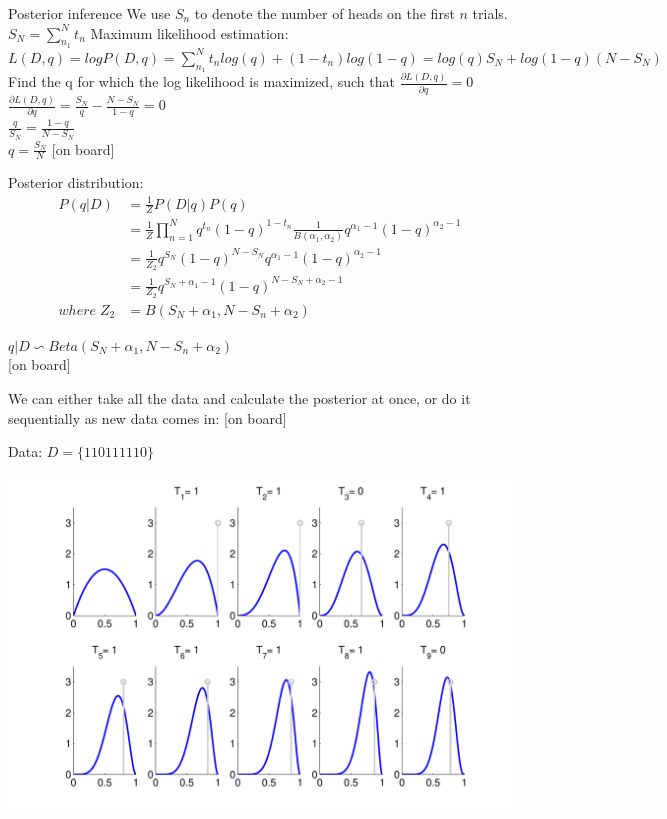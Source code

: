 \begin{bbbox}{Posterior inference}
We use $S_n$ to denote the number of heads on the first $n$ trials.
$S_N = \sum_{n_1}^N t_n$
\vspace{.5cm}
Maximum likelihood estimation:
$L(D,q) = log P(D,q) = \sum_{n_1}^N t_n log(q) + (1-t_n) log(1-q) = log(q) S_N + log(1-q)(N-S_N)$\\
Find the q for which the log likelihood is maximized, such that
$\frac{\partial L(D,q)}{\partial q} = 0$\\
$\frac{\partial L(D,q)}{\partial q} = \frac{S_N}{q} - \frac{N-S_N}{1-q} = 0$\\
$\frac{q}{S_N} = \frac{1-q}{N-S_N}$ \\
$q = \frac{S_N}{N}$
\vspace{.5cm}
[on board]

\vspace{.5cm}
Posterior distribution:
\begin{align}
P(q | D) &= \frac{1}{Z}P(D|q)P(q) \\
&= \frac{1}{Z} \prod_{n=1}^N q^{t_n} (1-q)^{1-t_n} \frac{1}{B(\alpha_1,\alpha_2)} q^{\alpha_1 -1} (1-q)^{\alpha_2 - 1} \nonumber \\
&= \frac{1}{Z_2} q^{S_N} (1-q)^{N - S_N} q^{\alpha_1 -1} (1-q)^{\alpha_2 - 1} \nonumber \\
&= \frac{1}{Z_2} q^{S_N + \alpha_1 -1} (1-q)^{N - S_N + \alpha_2 - 1} \nonumber \\
where \; Z_2 &= B(S_N + \alpha_1, N - S_n + \alpha_2) \nonumber
\end{align}

$q | D \backsim Beta(S_N + \alpha_1, N - S_n + \alpha_2)$ \\
\vspace{.5cm}
[on board]
\end{bbbox}

\vspace{.5cm}
We can either take all the data and calculate the posterior at once, or do it sequentially as new data comes in:
\vspace{.5cm}
[on board]

Data: $D=\{1     1     0     1     1     1     1     1     0\}$

\includegraphics[width=\textwidth]{./lecture2/BetaPosterior}

